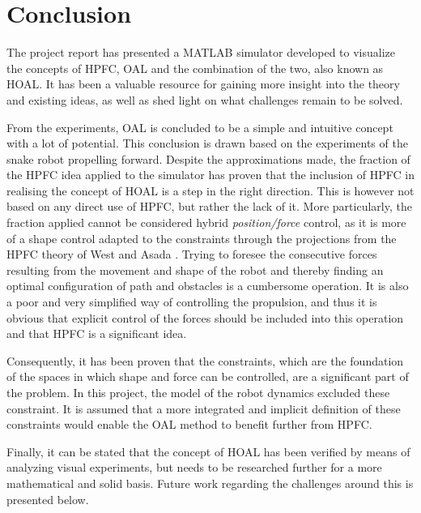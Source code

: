 \chapter{Conclusion}\label{outlook}

The project report has presented a MATLAB simulator developed to visualize the concepts of HPFC, OAL and the combination of the two, also known as HOAL. It has been a valuable resource for gaining more insight into the theory and existing ideas, as well as shed light on what challenges remain to be solved.

From the experiments, OAL is concluded to be a simple and intuitive concept with a lot of potential. This conclusion is drawn based on the experiments of the snake robot propelling forward.
Despite the approximations made, the fraction of the HPFC idea applied to the simulator has proven that the inclusion of HPFC in realising the concept of HOAL is a step in the right direction. This is however not based on any direct use of HPFC, but rather the lack of it. More particularly, the fraction applied cannot be considered hybrid \textit{position/force} control, as it is more of a shape control adapted to the constraints through the projections from the HPFC theory of West and Asada \cite{west1985method}.
Trying to foresee the consecutive forces resulting from the movement and shape of the robot and thereby finding an optimal configuration of path and obstacles is a cumbersome operation. It is also a poor and very simplified way of controlling the propulsion, and thus it is obvious that explicit control of the forces should be included into this operation and that HPFC is a significant idea.

Consequently, it has been proven that the constraints, which are the foundation of the spaces in which shape and force can be controlled, are a significant part of the problem. In this project, the model of the robot dynamics excluded these constraint. It is assumed that a more integrated and implicit definition of these constraints would enable the OAL method to benefit further from HPFC.


Finally, it can be stated that the concept of HOAL has been verified by means of analyzing visual experiments, but needs to be researched further for a more mathematical and solid basis. Future work regarding the challenges around this is presented below.

